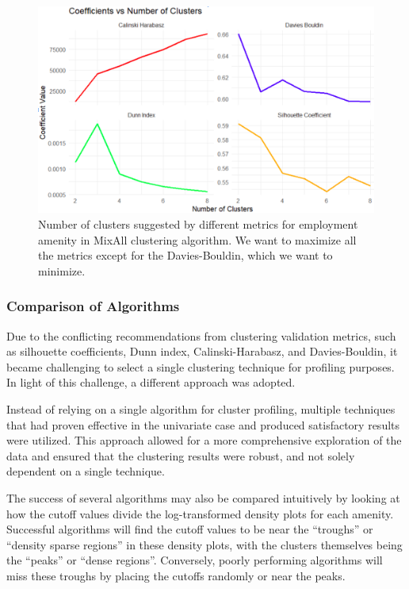 \documentclass[11pt, a4paper]{article}
\begin{document}
\begin{figure}[H]
\centering
\includegraphics[width=\textwidth]{./coefs_demo/coefs_demo.png}
\caption[Number of cluster selection]{Number of clusters suggested by different metrics for employment amenity in MixAll clustering algorithm. We want to maximize all the metrics except for the Davies-Bouldin, which we want to minimize.}\label{numselect}
\end{figure}






\subsubsection{Comparison of Algorithms}


Due to the conflicting recommendations from clustering validation metrics, such as silhouette coefficients, Dunn index, Calinski-Harabasz, and Davies-Bouldin, it became challenging to select a single clustering technique for profiling purposes. In light of this challenge, a different approach was adopted.
\par
Instead of relying on a single algorithm for cluster profiling, multiple techniques that had proven effective in the univariate case and produced satisfactory results were utilized. This approach allowed for a more comprehensive exploration of the data and ensured that the clustering results were robust, and not solely dependent on a single technique.
\par
The success of several algorithms may also be compared intuitively by looking at how the cutoff values divide the log-transformed density plots for each amenity. Successful algorithms will find the cutoff values to be near the “troughs” or ``density sparse regions'' in these density plots, with the clusters themselves being the ``peaks'' or ``dense regions''. Conversely, poorly performing algorithms will miss these troughs by placing the cutoffs randomly or near the peaks.
\end{document}
